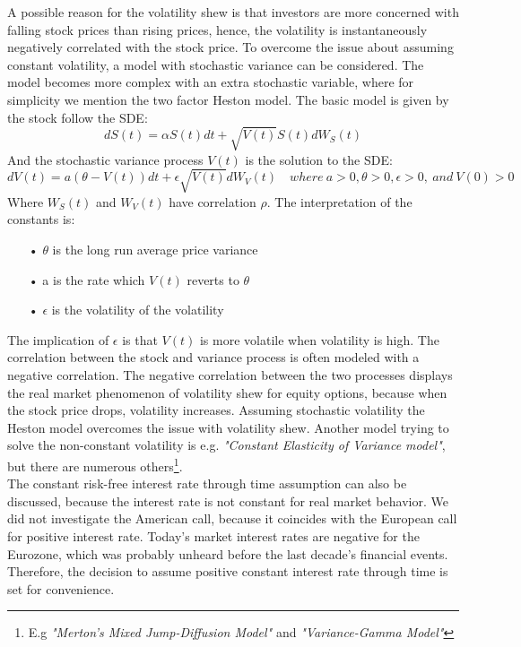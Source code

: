 A possible reason for the volatility shew is that investors are more concerned with falling stock prices than rising prices, hence, the volatility is instantaneously negatively correlated with the stock price. To overcome the issue about assuming constant volatility, a model with stochastic variance can be considered. The model becomes more complex with an extra stochastic variable, where for simplicity we mention the two factor Heston model. The basic model is given by the stock follow the SDE:
$$dS(t)=\alpha S(t) dt + \sqrt{V(t)} S(t) dW_S(t)$$
And the stochastic variance process $V(t)$ is the solution to the SDE:
$$dV(t)=a(\theta - V(t))dt + \epsilon \sqrt{V(t)} dW_V(t) \quad where \ a>0,\theta>0, \epsilon>0, \ and \ V(0)>0$$
Where $W_S(t)$ and $W_V(t)$ have correlation $\rho$. The interpretation of the constants is:
\begin{enumerate}
\item[•] $\theta$ is the long run average price variance
\item[•] a is the rate which $V(t)$ reverts to $\theta$
\item[•] $\epsilon$ is the volatility of the volatility
\end{enumerate} 
The implication of $\epsilon$ is that $V(t)$ is more volatile when volatility is high. The correlation between the stock and variance process is often modeled with a negative correlation. The negative correlation between the two processes displays the real market phenomenon of volatility shew for equity options, because when the stock price drops, volatility increases. Assuming stochastic volatility the Heston model overcomes the issue with volatility shew. Another model trying to solve the non-constant volatility is e.g. \textsl{"Constant Elasticity of Variance model"}, but there are numerous others\footnote{E.g \textsl{"Merton's Mixed Jump-Diffusion Model"} and \textsl{"Variance-Gamma Model"}}. \\

The constant risk-free interest rate through time assumption can also be discussed, because the interest rate is not constant for real market behavior. We did not investigate the American call, because it coincides with the European call for positive interest rate. Today's market interest rates are negative for the Eurozone, which was probably unheard before the last decade's financial events. Therefore, the decision to assume positive constant interest rate through time is set for convenience.\\

